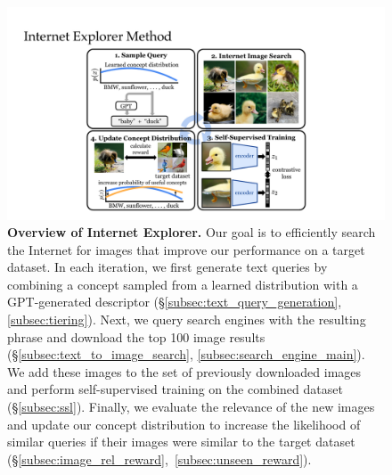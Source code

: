 \begin{figure}[t]
    \centering
    \includegraphics[width=0.85\linewidth]{figures/method_fig2.pdf}
    \caption{\textbf{Overview of Internet Explorer.} Our goal is to efficiently search the Internet for images that improve our performance on a target dataset.
        In each iteration, we first generate text queries by combining a concept sampled from a learned distribution with a GPT-generated descriptor (\S\ref{subsec:text_query_generation}, \ref{subsec:tiering}). Next, we query search engines with the resulting phrase and download the top 100 image results (\S\ref{subsec:text_to_image_search}, \ref{subsec:search_engine_main}). We add these images to the set of previously downloaded images and perform self-supervised training on the combined dataset (\S\ref{subsec:ssl}). Finally, we evaluate the relevance of the new images and update our concept distribution to increase the likelihood of similar queries if their images were similar to the target dataset (\S\ref{subsec:image_rel_reward},~\ref{subsec:unseen_reward}).
    }
    \label{fig:method}
    \vspace{-1em}
\end{figure}


